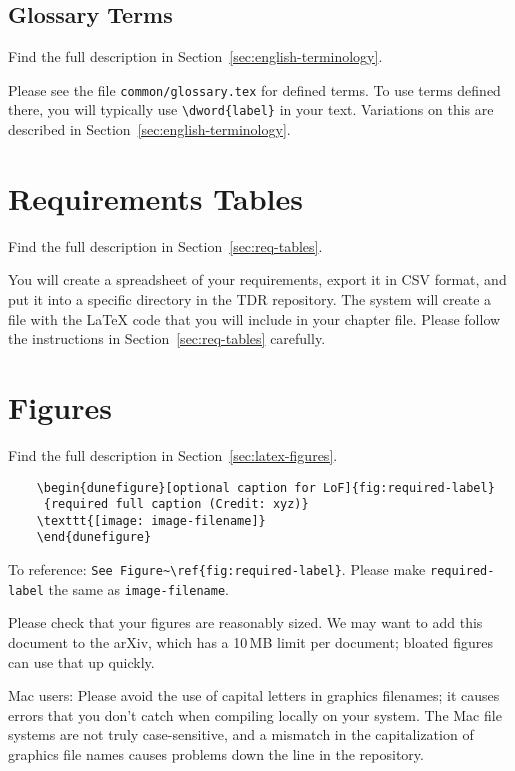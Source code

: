 \subsection{Glossary Terms}
\begin{framed}
Find the full description in Section~\ref{sec:english-terminology}.

Please see the file \verb|common/glossary.tex| for defined terms. To use terms defined there, you will typically use \verb|\dword{label}| in your text.  Variations on this are described in Section~\ref{sec:english-terminology}.
\end{framed}

\section{Requirements Tables}
\begin{framed}
Find the full description in Section~\ref{sec:req-tables}.

You will create a spreadsheet of your requirements, export it in CSV format, and put it into a specific directory in the TDR repository. The system will create a file with the LaTeX code that you will include in your chapter file.  Please follow the instructions in 
Section~\ref{sec:req-tables} carefully. 
\end{framed}

\section{Figures}
\begin{framed}
Find the full description in Section~\ref{sec:latex-figures}.
\begin{verbatim}
    \begin{dunefigure}[optional caption for LoF]{fig:required-label}
     {required full caption (Credit: xyz)}
    \texttt{[image: image-filename]}
    \end{dunefigure}
\end{verbatim}
To reference: \verb|See Figure~\ref{fig:required-label}|.
Please make \verb|required-label| the same as \verb|image-filename|. 

Please check that your figures are reasonably sized. We may want to add this document to the arXiv, which has a 10\,MB limit per document; bloated figures can use that up quickly. 

Mac users: Please avoid the use of capital letters in graphics filenames; it causes errors that you don't catch when compiling locally on your system. The Mac file systems are not truly case-sensitive, and a mismatch in the capitalization of graphics file names causes problems down the line in the repository.
\end{framed}

